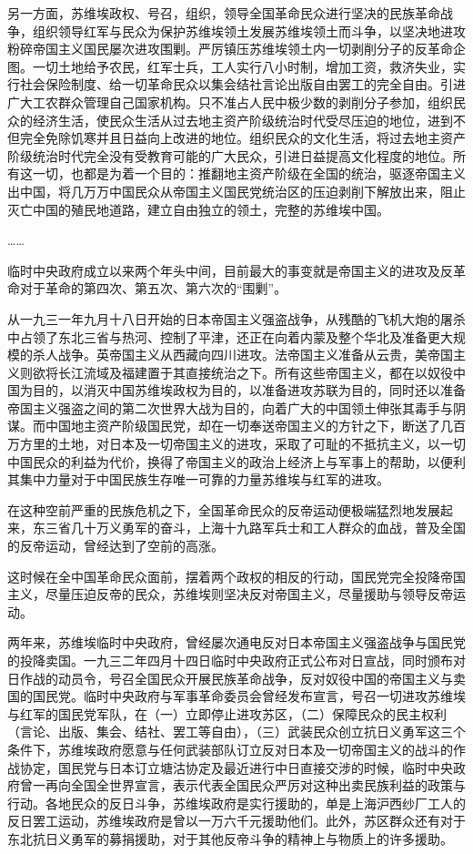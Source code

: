 另一方面，苏维埃政权、号召，组织，领导全国革命民众进行坚决的民族革命战争，组织领导红军与民众为保护苏维埃领土发展苏维埃领土而斗争，以坚决地进攻粉碎帝国主义国民屡次进攻围剿。严厉镇压苏维埃领土内一切剥削分子的反革命企图。一切土地给予农民，红军士兵，工人实行八小时制，增加工资，救济失业，实行社会保险制度、给一切革命民众以集会结社言论出版自由罢工的完全自由。引进广大工农群众管理自己国家机构。只不准占人民中极少数的剥削分子参加，组织民众的经济生活，使民众生活从过去地主资产阶级统治时代受尽压迫的地位，进到不但完全免除饥寒并且日益向上改进的地位。组织民众的文化生活，将过去地主资产阶级统治时代完全没有受教育可能的广大民众，引进日益提高文化程度的地位。所有这一切，也都是为着一个目的：推翻地主资产阶级在全国的统治，驱逐帝国主义出中国，将几万万中国民众从帝国主义国民党统治区的压迫剥削下解放出来，阻止灭亡中国的殖民地道路，建立自由独立的领土，完整的苏维埃中国。

……

临时中央政府成立以来两个年头中间，目前最大的事变就是帝国主义的进攻及反革命对于革命的第四次、第五次、第六次的“围剿”。

从一九三一年九月十八日开始的日本帝国主义强盗战争，从残酷的飞机大炮的屠杀中占领了东北三省与热河、控制了平津，还正在向着内蒙及整个华北及准备更大规模的杀人战争。英帝国主义从西藏向四川进攻。法帝国主义准备从云贵，美帝国主义则欲将长江流域及福建置于其直接统治之下。所有这些帝国主义，都在以奴役中国为目的，以消灭中国苏维埃政权为目的，以准备进攻苏联为目的，同时还以准备帝国主义强盗之间的第二次世界大战为目的，向着广大的中国领土伸张其毒手与阴谋。而中国地主资产阶级国民党，却在一切奉送帝国主义的方针之下，断送了几百万方里的土地，对日本及一切帝国主义的进攻，采取了可耻的不抵抗主义，以一切中国民众的利益为代价，换得了帝国主义的政治上经济上与军事上的帮助，以便利其集中力量对于中国民族生存唯一可靠的力量苏维埃与红军的进攻。

在这种空前严重的民族危机之下，全国革命民众的反帝运动便极端猛烈地发展起来，东三省几十万义勇军的奋斗，上海十九路军兵士和工人群众的血战，普及全国的反帝运动，曾经达到了空前的高涨。

这时候在全中国革命民众面前，摆着两个政权的相反的行动，国民党完全投降帝国主义，尽量压迫反帝的民众，苏维埃则坚决反对帝国主义，尽量援助与领导反帝运动。

两年来，苏维埃临时中央政府，曾经屡次通电反对日本帝国主义强盗战争与国民党的投降卖国。一九三二年四月十四日临时中央政府正式公布对日宣战，同时颁布对日作战的动员令，号召全国民众开展民族革命战争，反对奴役中国的帝国主义与卖国的国民党。临时中央政府与军事革命委员会曾经发布宣言，号召一切进攻苏维埃与红军的国民党军队，在（一）立即停止进攻苏区，（二）保障民众的民主权利（言论、出版、集会、结社、罢工等自由），（三）武装民众创立抗日义勇军这三个条件下，苏维埃政府愿意与任何武装部队订立反对日本及一切帝国主义的战斗的作战协定，国民党与日本订立塘沽协定及最近进行中日直接交涉的时候，临时中央政府曾一再向全国全世界宣言，表示代表全国民众严厉对这种出卖民族利益的政策与行动。各地民众的反日斗争，苏维埃政府是实行援助的，单是上海沪西纱厂工人的反日罢工运动，苏维埃政府是曾以一万六千元援助他们。此外，苏区群众还有对于东北抗日义勇军的募捐援助，对于其他反帝斗争的精神上与物质上的许多援助。

